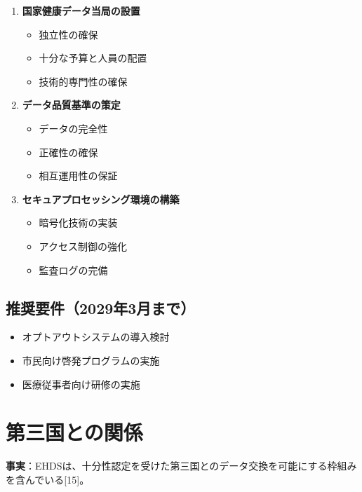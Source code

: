 \documentclass[
  a4paper,
  a4paper,
  11pt]{ltjsbook}
\providecommand{\tightlist}{%
  \setlength{\itemsep}{0pt}\setlength{\parskip}{0pt}}
\begin{document}
\begin{enumerate}
\def\labelenumi{\arabic{enumi}.}
\tightlist
\item
  \textbf{国家健康データ当局の設置}

  \begin{itemize}
  \tightlist
  \item
    独立性の確保
  \item
    十分な予算と人員の配置
  \item
    技術的専門性の確保
  \end{itemize}
\item
  \textbf{データ品質基準の策定}

  \begin{itemize}
  \tightlist
  \item
    データの完全性
  \item
    正確性の確保
  \item
    相互運用性の保証
  \end{itemize}
\item
  \textbf{セキュアプロセッシング環境の構築}

  \begin{itemize}
  \tightlist
  \item
    暗号化技術の実装
  \item
    アクセス制御の強化
  \item
    監査ログの完備
  \end{itemize}
\end{enumerate}

\subsection{推奨要件（2029年3月まで）}\label{ux63a8ux5968ux8981ux4ef62029ux5e743ux6708ux307eux3067}

\begin{itemize}
\tightlist
\item
  オプトアウトシステムの導入検討
\item
  市民向け啓発プログラムの実施
\item
  医療従事者向け研修の実施
\end{itemize}

\section{第三国との関係}\label{ux7b2cux4e09ux56fdux3068ux306eux95a2ux4fc2}

\textbf{事実}：EHDSは、十分性認定を受けた第三国とのデータ交換を可能にする枠組みを含んでいる{[}15{]}。
\end{document}
